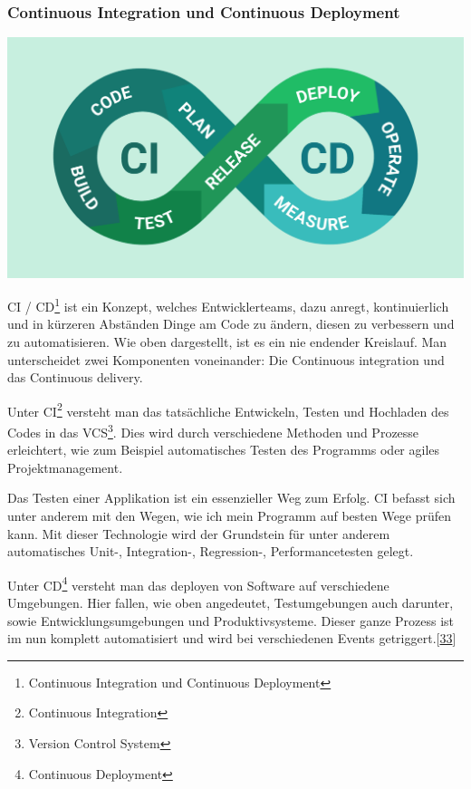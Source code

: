 \documentclass[
    headings=optiontotocandhead,%
    twoside,
    numbers=noenddot,%
    12pt, %
    titlepage, %
    parskip=full, %
    listof=leveldown, 
    numbers=noenddot, %
    a4paper,DIV=14,
    BCOR=15mm,
]{scrbook}
\let\origfigure=\figure
\let\endorigfigure=\endfigure
\renewenvironment{figure}[1][]{%
   \origfigure[H]
}{%
   \endorigfigure
}
\begin{document}
\hypertarget{continuous-integration-und-continuous-deployment}{%
\subsubsection{Continuous Integration und Continuous
Deployment}\label{continuous-integration-und-continuous-deployment}}

\begin{figure}
\centering
\includegraphics[width=1\textwidth,height=\textheight]{img/Schrempf/ci-cd.png}
\caption{CI / CD Ablauf {[}\protect\hyperlink{ref-bestarion}{33}{]}}
\end{figure}

CI / CD\footnote{Continuous Integration und Continuous Deployment} ist
ein Konzept, welches Entwicklerteams, dazu anregt, kontinuierlich und in
kürzeren Abständen Dinge am Code zu ändern, diesen zu verbessern und zu
automatisieren. Wie oben dargestellt, ist es ein nie endender Kreislauf.
Man unterscheidet zwei Komponenten voneinander: Die Continuous
integration und das Continuous delivery.

Unter CI\footnote{Continuous Integration} versteht man das tatsächliche
Entwickeln, Testen und Hochladen des Codes in das VCS\footnote{Version
  Control System}. Dies wird durch verschiedene Methoden und Prozesse
erleichtert, wie zum Beispiel automatisches Testen des Programms oder
agiles Projektmanagement.

Das Testen einer Applikation ist ein essenzieller Weg zum Erfolg. CI
befasst sich unter anderem mit den Wegen, wie ich mein Programm auf
besten Wege prüfen kann. Mit dieser Technologie wird der Grundstein für
unter anderem automatisches Unit-, Integration-, Regression-,
Performancetesten gelegt.

Unter CD\footnote{Continuous Deployment} versteht man das deployen von
Software auf verschiedene Umgebungen. Hier fallen, wie oben angedeutet,
Testumgebungen auch darunter, sowie Entwicklungsumgebungen und
Produktivsysteme. Dieser ganze Prozess ist im nun komplett automatisiert
und wird bei verschiedenen Events
getriggert.{[}\protect\hyperlink{ref-bestarion}{33}{]}
\end{document}

